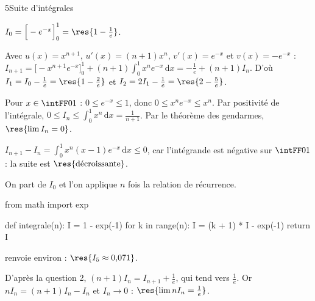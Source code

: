 \begin{corrigeBac}{5}{Suite d'intégrales}
\begin{questions}
  \item $I_0=\Big[-e^{-x}\Big]_0^1=\res{1-\tfrac1e}$. 
  \item Avec $u(x)=x^{n+1}$, $u'(x)=(n+1)x^{n}$, $v'(x)=e^{-x}$ et $v(x)=-e^{-x}$ :
    $I_{n+1}=\Big[-x^{n+1}e^{-x}\Big]_0^1+(n+1)\displaystyle\int_0^1x^{n}e^{-x}\,\mathrm{d}x=-\frac1e+(n+1)I_n$. D'où
    $I_1=I_0-\frac1e=\res{1-\tfrac2e}$ et $I_2=2I_1-\frac1e=\res{2-\tfrac5e}$. 
  \item Pour $x\in\intFF01$ : $0\leq e^{-x}\leq1$, donc $0\leq x^{n}e^{-x}\leq x^{n}$. Par positivité de l'intégrale,
    $0\leq I_n\leq\displaystyle\int_0^1x^{n}\,\mathrm{d}x=\frac{1}{n+1}$. Par le théorème des gendarmes, $\res{\lim I_n=0}$. 
  \item $I_{n+1}-I_n=\displaystyle\int_0^1x^{n}(x-1)e^{-x}\,\mathrm{d}x\leq0$, car l'intégrande est négative sur $\intFF01$ : la suite est
    $\res{\text{décroissante}}$. 
  \item On part de $I_0$ et l'on applique $n$ fois la relation de récurrence.
\begin{codecote}[0.5]
\begin{pythoncol}
from math import exp

def integrale(n):
    I = 1 - exp(-1)
    for k in range(n):
        I = (k + 1) * I - exp(-1)
    return I
\end{pythoncol}
\cote
{} renvoie environ  : $\res{I_5\approx0{,}071}$.
\end{codecote}
  \item D'après la question 2, $(n+1)I_n=I_{n+1}+\frac1e$, qui tend vers $\frac1e$. Or $nI_n=(n+1)I_n-I_n$ et $I_n\to0$ :
    $\res{\lim nI_n=\tfrac1e}$. 
\end{questions}
\end{corrigeBac}
